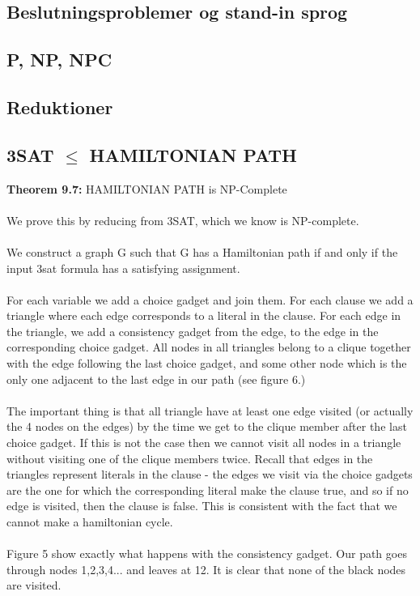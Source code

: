 \subsection{Beslutningsproblemer og stand-in sprog}
\subsection{P, NP, NPC}
\subsection{Reduktioner}
\subsection{3SAT $\le$ HAMILTONIAN PATH}
\textbf{Theorem 9.7:} HAMILTONIAN PATH is NP-Complete\\\\
We prove this by reducing from 3SAT, which we know is NP-complete.\\\\
We construct a graph G such that G has a Hamiltonian path if and only if the input 3sat formula has a satisfying assignment.\\\\
For each variable we add a choice gadget and join them. For each clause we add a triangle where each edge corresponds to a literal in the clause. For each edge in the triangle, we add a consistency gadget from the edge, to the edge in the corresponding choice gadget. All nodes in all triangles belong to a clique together with the edge following the last choice gadget, and some other node which is the only one adjacent to the last edge in our path (see figure 6.)\\\\
The important thing is that all triangle have at least one edge visited (or actually the 4 nodes on the edges) by the time we get to the clique member after the last choice gadget. If this is not the case then we cannot visit all nodes in a triangle without visiting one of the clique members twice. Recall that edges in the triangles represent literals in the clause - the edges we visit via the choice gadgets are the one for which the corresponding literal make the clause true, and so if no edge is visited, then the clause is false. This is consistent with the fact that we cannot make a hamiltonian cycle. \\\\
Figure 5 show exactly what happens with the consistency gadget. Our path goes through nodes 1,2,3,4... and leaves at 12. It is clear that none of the black nodes are visited. \\\\
